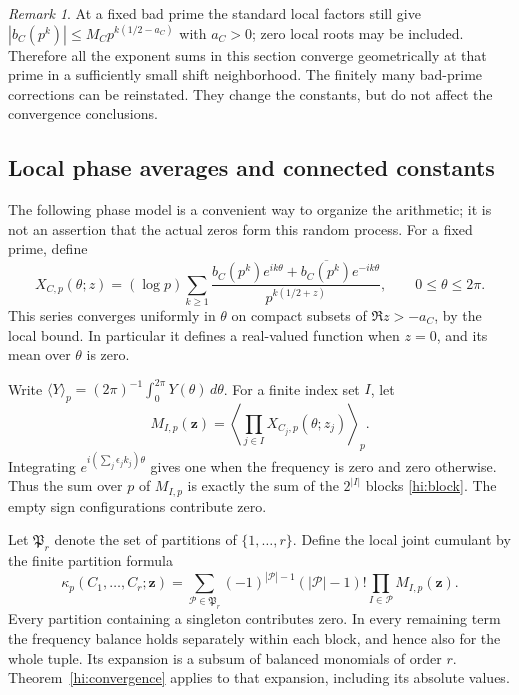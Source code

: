 \documentclass[11pt,reqno]{amsart}
\numberwithin{equation}{section}
\theoremstyle{definition}
\theoremstyle{remark}
\newtheorem{remark}[theorem]{Remark}
\begin{document}
\begin{remark}\label{hi:bad-primes}
At a fixed bad prime the standard local factors still give
$|b_C(p^k)|\leq M_Cp^{k(1/2-a_C)}$ with $a_C>0$; zero local roots may be
included.  Therefore all the exponent sums in this section converge
geometrically at that prime in a sufficiently small shift neighborhood.
The finitely many bad-prime corrections can be reinstated.  They change
the constants, but do not affect the convergence conclusions.
\end{remark}

\subsection{Local phase averages and connected constants}

The following phase model is a convenient way to organize the arithmetic;
it is not an assertion that the actual zeros form this random process.
For a fixed prime, define
\begin{equation}\label{hi:local-phase}
 X_{C,p}(\theta;z)
 =(\log p)\sum_{k\geq1}
 \frac{b_C(p^k)e^{ik\theta}
       +\overline{b_C(p^k)}e^{-ik\theta}}
 {p^{k(1/2+z)}},\qquad 0\leq\theta\leq2\pi.
\end{equation}
This series converges uniformly in $\theta$ on compact subsets of
$\Re z>-a_C$, by the local bound.  In particular it defines a real-valued
function when $z=0$, and its mean over $\theta$ is zero.

Write $\langle Y\rangle_p=(2\pi)^{-1}\int_0^{2\pi}Y(\theta)\,d\theta$.
For a finite index set $I$, let
\[
 M_{I,p}(\boldsymbol z)
 =\left\langle\prod_{j\in I}X_{C_j,p}(\theta;z_j)\right\rangle_p.
\]
Integrating $e^{i(\sum_j\epsilon_jk_j)\theta}$ gives one when the frequency
is zero and zero otherwise.  Thus the sum over $p$ of $M_{I,p}$ is exactly
the sum of the $2^{|I|}$ blocks \eqref{hi:block}.  The empty sign configurations
contribute zero.

Let $\mathfrak P_r$ denote the set of partitions of $\{1,\ldots,r\}$.
Define the local joint cumulant by the finite partition formula
\begin{equation}\label{hi:cumulant}
 \kappa_p(C_1,\ldots,C_r;\boldsymbol z)
 =\sum_{\mathcal P\in\mathfrak P_r}
 (-1)^{|\mathcal P|-1}(|\mathcal P|-1)!
 \prod_{I\in\mathcal P}M_{I,p}(\boldsymbol z).
\end{equation}
Every partition containing a singleton contributes zero.  In every
remaining term the frequency balance holds separately within each block,
and hence also for the whole tuple.  Its expansion is a subsum of balanced
monomials of order $r$.  Theorem~\ref{hi:convergence} applies to that expansion,
including its absolute values.
\end{document}
